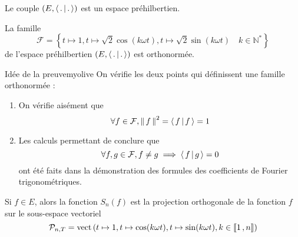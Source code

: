     \begin{coro}{}{}
        Le couple $\left(E, \left<\,.\,\middle|\,.\,\right>\right)$ est un espace préhilbertien.
    \end{coro}

    \begin{prop}{}{}
        La famille 
        \[ \mathcal{F} = \left\{ t \mapsto 1, t \mapsto \sqrt{2} \cos(k \omega t), t \mapsto \sqrt{2} \sin (k \omega t) \quad k \in \mathbb{N}^* \right\}\] 
        de l’espace préhilbertien $\left(E, \left<\,.\,\middle|\,.\,\right>\right)$ est orthonormée.
    \end{prop}

    \begin{demo}{Idée de la preuve}{myolive}
        On vérifie les deux points qui définissent une famille orthonormée : 
        \begin{enumerate}
            \item On vérifie aisément que 
            \[ \forall f \in \mathcal{F}, \left\lVert \,f \, \right\rVert^2 = \left<\,f\,\middle|\,f\,\right> = 1 \]
            \item Les calculs permettant de conclure que 
            \[ \forall f,g \in \mathcal{F}, f \neq g \implies \left<\,f\,\middle|\,g\,\right> = 0 \] ont été faits dans la démonstration des formules des coefficients de Fourier trigonométriques.
        \end{enumerate}
    \end{demo}

    \begin{coro}{}{}
        Si $f \in E$, alors la fonction $S_n(f)$ est la projection orthogonale de la fonction $f$ sur le sous-espace vectoriel 
        \[ \mathcal{P}_{n,T} = \operatorname{vect}\left(t \mapsto 1, t \mapsto \cos(k \omega t), t \mapsto \sin (k \omega t), k \in \left\llbracket 1 \, , n \right\rrbracket \right) \]
    \end{coro}

